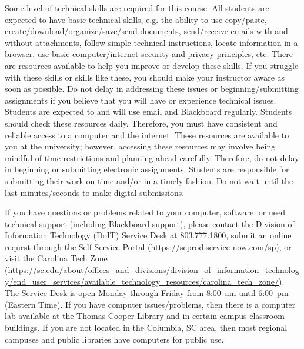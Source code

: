 \documentclass[11pt,letterpaper]{article}
\begin{document}

Some level of technical skills are required for this course. All students are expected to have basic technical skills, e.g. the ability to use copy/paste, create/download/organize/save/send documents, send/receive emails with and without attachments, follow simple technical instructions, locate information in a browser, use basic computer/internet security and privacy principles, etc. There are resources available to help you improve or develop these skills. If you struggle with these skills or skills like these, you should make your instructor aware as soon as possible. Do not delay in addressing these issues or beginning/submitting assignments if you believe that you will have or experience technical issues. Students are expected to and will use email and Blackboard regularly. Students should check these resources daily. Therefore, you must have consistent and reliable access to a computer and the internet. These resources are available to you at the university; however, accessing these resources may involve being mindful of time restrictions and planning ahead carefully. Therefore, do not delay in beginning or submitting electronic assignments. Students are responsible for submitting their work on-time and/or in a timely fashion. Do not wait until the last minutes/seconds to make digital submissions. \pspace

If you have questions or problems related to your computer, software, or need technical support (including Blackboard support), please contact the Division of Information Technology (DoIT) Service Desk at 803.777.1800, submit an online request through the \href{https://scprod.service-now.com/sp}{Self-Service Portal} (\url{https://scprod.service-now.com/sp}), or visit the \href{https://sc.edu/about/offices\_and\_divisions/division\_of\_information\_technology/end\_user\_services/available\_technology\_resources/carolina\_tech\_zone/}{Carolina Tech Zone} (\url{https://sc.edu/about/offices\_and\_divisions/division\_of\_information\_technology/end\_user\_services/available\_technology\_resources/carolina\_tech\_zone/}). The Service Desk is open Monday through Friday from 8:00~am until 6:00~pm (Eastern Time). If you have computer issues/problems, then there is a computer lab available at the Thomas Cooper Library and in certain campus classroom buildings. If you are not located in the Columbia, SC area, then most regional campuses and public libraries have computers for public use. \pspace
\end{document}
